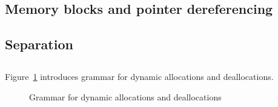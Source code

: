 \subsection{Memory blocks and pointer dereferencing}
\label{subsec:memory}
\label{sec:memory} %
\nodiff



\subsection{Separation}\label{sec:separation}
\nodiff



\subsection{}
\label{sec:alloc-dealloc}
\nodiff


Figure~\ref{fig:gram:allocation} introduces grammar for dynamic allocations and
deallocations.

\begin{figure}[htp]
  \begin{cadre}
      
    \end{cadre}
  \caption{Grammar for dynamic allocations and deallocations}
\label{fig:gram:allocation}
\end{figure}


\section{}

